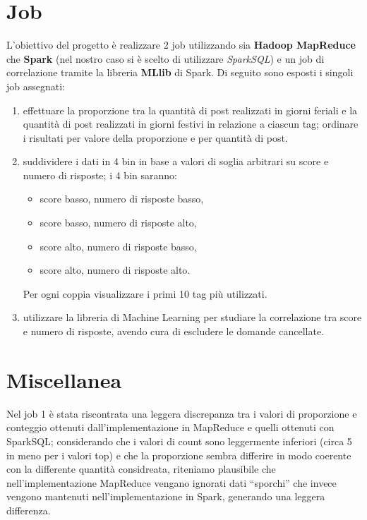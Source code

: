 \documentclass[
  a4paper,            %
  10pt                %
]{article}
\begin{document}
  \section{Job}\label{sec:job}

  L'obiettivo del progetto è realizzare 2 job utilizzando sia \textbf{Hadoop MapReduce} che \textbf{Spark} (nel nostro caso si è scelto di utilizzare \textit{SparkSQL})
  e un job di correlazione tramite la libreria \textbf{MLlib} di Spark.
  Di seguito sono esposti i singoli job assegnati:

  \begin{enumerate}
    \item
      effettuare la proporzione tra la quantità di post realizzati in giorni feriali e la quantità di post realizzati in giorni festivi in relazione a ciascun tag;
      ordinare i risultati per valore della proporzione e per quantità di post.

    \item
      suddividere i dati in 4 bin in base a valori di soglia arbitrari su score e numero di risposte; i 4 bin saranno:
      \begin{itemize}
        \item score basso, numero di risposte basso,
        \item score basso, numero di risposte alto,
        \item score alto, numero di risposte basso,
        \item score alto, numero di risposte alto.
      \end{itemize}
      Per ogni coppia visualizzare i primi 10 tag più utilizzati.

    \item
      utilizzare la libreria di Machine Learning per studiare la correlazione tra score e numero di risposte, avendo cura di escludere le domande cancellate.
  \end{enumerate}

  
  
  

  \section{Miscellanea}\label{sec:miscellaneous}

  Nel job 1 è stata riscontrata una leggera discrepanza tra i valori di proporzione e conteggio ottenuti dall'implementazione in MapReduce e quelli ottenuti con SparkSQL\@;
  considerando che i valori di count sono leggermente inferiori (circa 5 in meno per i valori top) e che la proporzione sembra differire in modo coerente con la differente quantità considreata,
  riteniamo plausibile che nell'implementazione MapReduce vengano ignorati dati ``sporchi'' che invece vengono mantenuti nell'implementazione in Spark, generando una leggera differenza.
\end{document}
